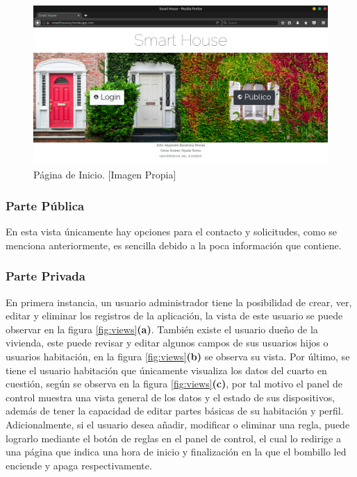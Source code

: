 \begin{figure}[!t]
\centering
\caption{Página de Inicio. [Imagen Propia]}
\label{fig:index}
\includegraphics[width=0.9\linewidth]{Imagenes/Index}
\end{figure}

\subsubsection{Parte Pública}

En esta vista únicamente hay opciones para el contacto y solicitudes, como se menciona anteriormente, es sencilla debido a la poca información que contiene.

\subsubsection{Parte Privada}

En primera instancia, un usuario administrador tiene la posibilidad de crear, ver, editar y eliminar los registros de la aplicación, la vista de este usuario se puede observar en la figura \ref{fig:views}\textbf{(a)}. También existe el usuario dueño de la vivienda, este puede revisar y editar algunos campos de sus usuarios hijos o usuarios habitación,  en la figura \ref{fig:views}\textbf{(b)} se observa su vista. Por último, se tiene el usuario habitación que únicamente visualiza los datos  del cuarto en cuestión, según se observa en la figura \ref{fig:views}\textbf{(c)}, por tal motivo el panel de control muestra una vista general de los datos y el estado de sus dispositivos, además de tener la capacidad de editar partes básicas de su habitación y perfil.\\

Adicionalmente, si el usuario desea añadir, modificar o eliminar una regla, puede lograrlo mediante el botón de reglas en el panel de control, el cual lo redirige a una página que indica una hora de inicio y finalización en la que el bombillo led enciende y apaga respectivamente. \\

